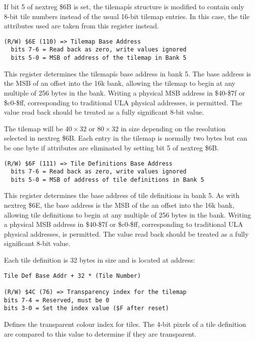 If bit 5 of nextreg \$6B is set, the tilemapís structure is modified
to contain only 8-bit tile numbers instead of the usual 16-bit tilemap
entries. In this case, the tile attributes used are taken from this
register instead.

\begin{verbatim}
(R/W) $6E (110) => Tilemap Base Address
  bits 7-6 = Read back as zero, write values ignored
  bits 5-0 = MSB of address of the tilemap in Bank 5
\end{verbatim}

This register determines the tilemapís base address in bank 5. The
base address is the MSB of an offset into the 16k bank, allowing the
tilemap to begin at any multiple of 256 bytes in the bank. Writing a
physical MSB address in \$40-\$7f or \$c0-\$ff, corresponding to
traditional ULA physical addresses, is permitted. The value read back
should be treated as a fully significant 8-bit value.

The tilemap will be $40\times32$ or $80\times32$ in size depending on
the resolution selected in nextreg \$6B. Each entry in the tilemap is
normally two bytes but can be one byte if attributes are eliminated by
setting bit 5 of nextreg \$6B.

\begin{verbatim}
(R/W) $6F (111) => Tile Definitions Base Address
  bits 7-6 = Read back as zero, write values ignored
  bits 5-0 = MSB of address of tile definitions in Bank 5
\end{verbatim}

This register determines the base address of tile definitions in bank
5. As with nextreg \$6E, the base address is the MSB of the an offset
into the 16k bank, allowing tile definitions to begin at any multiple
of 256 bytes in the bank. Writing a physical MSB address in \$40-\$7f
or \$c0-\$ff, corresponding to traditional ULA physical addresses, is
permitted. The value read back should be treated as a fully
significant 8-bit value.

Each tile definition is 32 bytes in size and is located at address:

\begin{verbatim}
Tile Def Base Addr + 32 * (Tile Number)

(R/W) $4C (76) => Transparency index for the tilemap
bits 7-4 = Reserved, must be 0
bits 3-0 = Set the index value ($F after reset)
\end{verbatim}

Defines the transparent colour index for tiles. The 4-bit pixels of a
tile definition are compared to this value to determine if they are
transparent.

